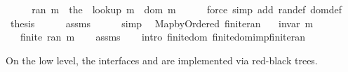 \begin{isabellebody}
%
\isadelimproof
%
\endisadelimproof
%
\isatagproof
{}\isamarkupfalse%
\ {\isacharminus}{\kern0pt}\isanewline
\ \ \isamarkupfalse%
\ {\isachardoublequoteopen}ran\ m\ {\isacharequal}{\kern0pt}\ {\isacharparenleft}{\kern0pt}the\ {\isasymcirc}\ lookup\ m{\isacharparenright}{\kern0pt}\ {\isacharbackquote}{\kern0pt}\ dom\ m{\isachardoublequoteclose}\isanewline
\ \ \ \ \isamarkupfalse%
\ {\isacharparenleft}{\kern0pt}force\ simp\ add{\isacharcolon}{\kern0pt}\ ran{\isacharunderscore}{\kern0pt}def\ dom{\isacharunderscore}{\kern0pt}def{\isacharparenright}{\kern0pt}\isanewline
\ \ \isamarkupfalse%
\ {\isacharquery}{\kern0pt}thesis\isanewline
\ \ \ \ \isamarkupfalse%
\ assms\isanewline
\ \ \ \ \isamarkupfalse%
\ simp\isanewline
{}\isamarkupfalse%
%
\endisatagproof
{\isafoldproof}%
%
\isadelimproof
\isanewline
%
\endisadelimproof
\isanewline
{}\isamarkupfalse%
\ {\isacharparenleft}{\kern0pt}\ Map{\isacharunderscore}{\kern0pt}by{\isacharunderscore}{\kern0pt}Ordered{\isacharparenright}{\kern0pt}\ finite{\isacharunderscore}{\kern0pt}ran{\isacharcolon}{\kern0pt}\isanewline
\ \ \ {\isachardoublequoteopen}invar\ m{\isachardoublequoteclose}\isanewline
\ \ \ {\isachardoublequoteopen}finite\ {\isacharparenleft}{\kern0pt}ran\ m{\isacharparenright}{\kern0pt}{\isachardoublequoteclose}\isanewline
%
\isadelimproof
\ \ %
\endisadelimproof
%
\isatagproof
{}\isamarkupfalse%
\ assms\isanewline
\ \ \isamarkupfalse%
\ {\isacharparenleft}{\kern0pt}intro\ finite{\isacharunderscore}{\kern0pt}dom\ finite{\isacharunderscore}{\kern0pt}dom{\isacharunderscore}{\kern0pt}imp{\isacharunderscore}{\kern0pt}finite{\isacharunderscore}{\kern0pt}ran{\isacharparenright}{\kern0pt}%
\endisatagproof
{\isafoldproof}%
%
\isadelimproof
%
\endisadelimproof
%
\begin{isamarkuptext}%
On the low level, the interfaces  and  are implemented via
red-black trees.%
\end{isamarkuptext}\isamarkuptrue%
%
\isadelimtheory
%
\endisadelimtheory
%
\isatagtheory
{}\isamarkupfalse%
%
\endisatagtheory
{\isafoldtheory}%
%
\isadelimtheory
%
\endisadelimtheory
%
\end{isabellebody}%
\endinput

